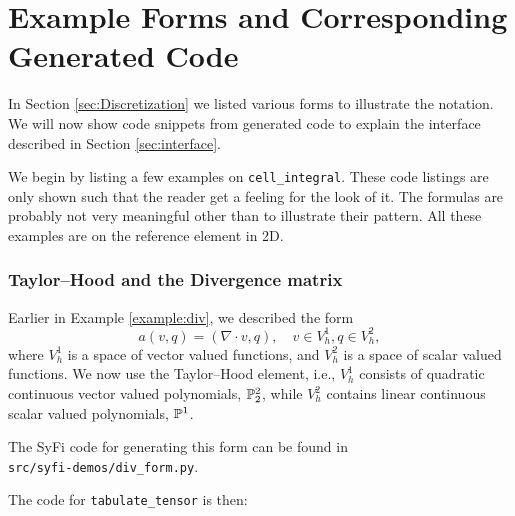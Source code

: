 \chapter{Example Forms and Corresponding Generated Code}


\label{CodeGenExamples}
In Section \ref{sec:Discretization} we listed various forms to illustrate the notation. We will now show code snippets from generated code to explain 
the interface described in Section \ref{sec:interface}. 

We begin by listing a few examples on \texttt{cell\_integral}. 
These code listings are only shown such that the reader get 
a feeling for the look of it. The formulas are probably not
very meaningful other than to illustrate their pattern. 
All these examples are on the reference element in 2D. 


\subsection{Taylor--Hood and the Divergence matrix} 
Earlier in Example \ref{example:div}, we described  
the form 
\begin{equation}
a(v,q) = (\nabla \cdot v, q), \quad v\in V_h^1, q \in V_h^2, 
\end{equation}
where $V_h^1$ is a space of vector valued functions, 
and $V_h^2$ is a space of scalar valued functions. 
We now use the Taylor--Hood element,  
i.e., $V_h^1$ consists of quadratic continuous vector valued polynomials, $\P^2_2$,
while $V_h^2$ contains linear continuous scalar valued polynomials, $\P^1$.  

The SyFi code for generating this form can be found in \\ 
\texttt{src/syfi-demos/div\_form.py}.

The code for \texttt{tabulate\_tensor} is then: 




